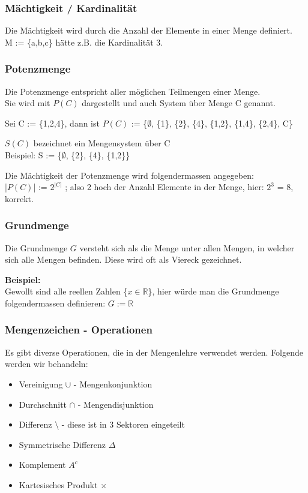 \documentclass[a4paper,12pt]{article}
\begin{document}
\subsubsection{Mächtigkeit / Kardinalität}
Die Mächtigkeit wird durch die Anzahl der Elemente in einer Menge definiert. \\
M := \{a,b,c\} hätte z.B. die Kardinalität 3.

\subsubsection{Potenzmenge}
Die Potenzmenge entspricht aller möglichen Teilmengen einer Menge. \\
Sie wird mit \( P(C) \) dargestellt und auch System über Menge C genannt.

Sei C := \{1,2,4\}, dann ist \( P(C) \) := \{$\emptyset$,  \{1\}, \{2\}, \{4\}, \{1,2\}, \{1,4\}, \{2,4\}, C\}

\( S(C) \) bezeichnet ein Mengensystem über C \\
Beispiel: S := \{$\emptyset$,  \{2\}, \{4\}, \{1,2\}\}

Die Mächtigkeit der Potenzmenge wird folgendermassen angegeben: \\
|\( P(C) \)| := $2^{|C|}$ ; also 2 hoch der Anzahl Elemente in der Menge, hier: $2^{3}$ = 8, korrekt.

\subsubsection{Grundmenge}
Die Grundmenge $G$ versteht sich als die Menge unter allen Mengen, in welcher sich alle Mengen befinden. Diese wird oft als Viereck gezeichnet.

\textbf{Beispiel:} \\
Gewollt sind alle reellen Zahlen \{$x \in \mathbb{R}$\}, hier würde man die Grundmenge folgendermassen definieren: $G := \mathbb{R}$

\subsubsection{Mengenzeichen - Operationen}
Es gibt diverse Operationen, die in der Mengenlehre verwendet werden. Folgende werden wir behandeln:
\begin{itemize}
  \item Vereinigung $\cup$ - Mengenkonjunktion
  \item Durchschnitt $\cap$ - Mengendisjunktion
  \item Differenz $\setminus$ - diese ist in 3 Sektoren eingeteilt
  \item Symmetrische Differenz $\Delta$
  \item Komplement $A^{c}$
  \item Kartesisches Produkt $\times$
\end{itemize}
\end{document}
